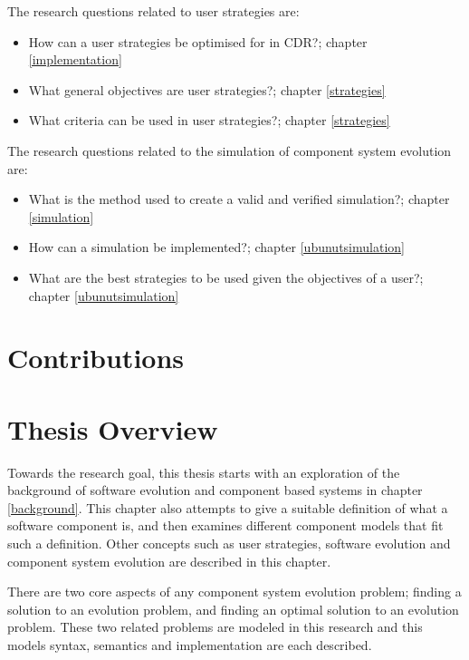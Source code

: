 The research questions related to user strategies are: 
\begin{itemize}
	\item How can a user strategies be optimised for in CDR?; chapter \ref{implementation}
	\item What general objectives are user strategies?;  chapter \ref{strategies}
	\item What criteria can be used in user strategies?; chapter \ref{strategies}
\end{itemize}

The research questions related to the simulation of component system evolution are: 
\begin{itemize}
	\item What is the method used to create a valid and verified simulation?;  chapter \ref{simulation}
	\item How can a simulation be implemented?;  chapter \ref{ubunutsimulation}
	\item What are the best strategies to be used given the objectives of a user?;  chapter \ref{ubunutsimulation}
\end{itemize}

\section{Contributions}

\section{Thesis Overview}
Towards the research goal, this thesis starts with an exploration of the background of software evolution and component based systems in chapter \ref{background}.
This chapter also attempts to give a suitable definition of what a software component is, and then examines different component models that fit such a definition.
Other concepts such as user strategies, software evolution and component system evolution are described in this chapter.

There are two core aspects of any component system evolution problem; 
finding a solution to an evolution problem, and finding an optimal solution to an evolution problem.
These two related problems are modeled in this research and this models syntax, semantics and implementation are each described.

